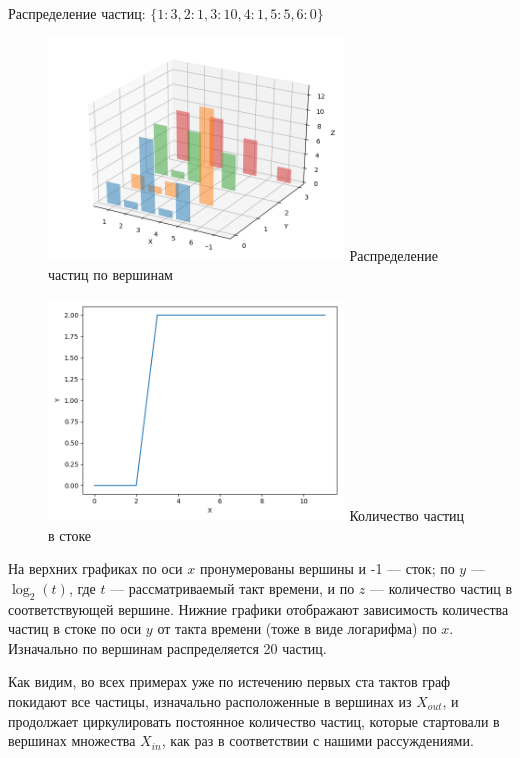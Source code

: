 \begin{example}
	Распределение частиц: $\{1: 3, 2: 1, 3: 10, 4: 1, 5: 5, 6: 0\}$
	
	\begin{figure}
		\centering	
		{\includegraphics[width=0.7\textwidth]{img/e3.png}}
		{Распределение частиц по вершинам}
		\label{fig:pic_e2}
	\end{figure}
	
	\begin{figure}
		\centering	
		{\includegraphics[width=0.7\textwidth]{img/e33.png}}
		{Количество частиц в стоке}
		\label{fig:pic_e22}
	\end{figure}
	
\end{example}

На верхних графиках по оси $x$ пронумерованы вершины и -1 --- сток; по $y$ --- $\log_2(t)$, где $t$ --- рассматриваемый такт времени, и по $z$ --- количество частиц в соответствующей вершине. Нижние графики отображают зависимость количества частиц в стоке по оси $y$ от такта времени (тоже в виде логарифма) по $x$. Изначально по вершинам распределяется 20 частиц.

Как видим, во всех примерах уже по истечению первых ста тактов граф покидают все частицы, изначально расположенные в вершинах из $X_{out}$, и продолжает циркулировать постоянное количество частиц, которые стартовали в вершинах множества $X_{in}$, как раз в соответствии с нашими рассуждениями.



